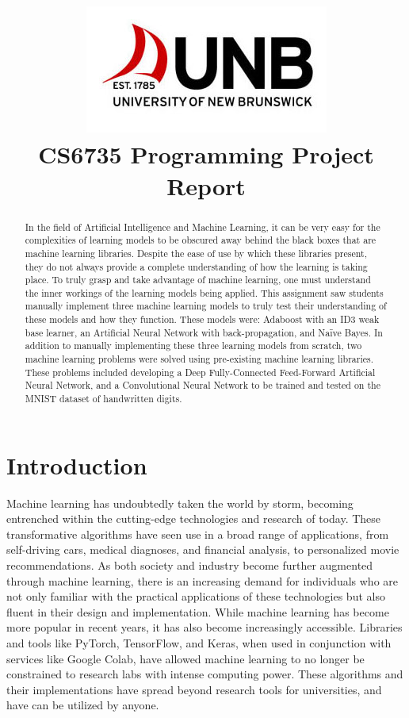 \documentclass[a4paper]{article}
\title{\includegraphics[scale=0.75]{images/unblogo.jpg}\\CS6735 Programming Project Report}
\begin{document}
\maketitle

\begin{abstract}
    In the field of Artificial Intelligence and Machine Learning, it can be very easy for the complexities of learning models to be obscured away behind the black boxes that are machine learning libraries. Despite the ease of use by which these libraries present, they do not always provide a complete understanding of how the learning is taking place. To truly grasp and take advantage of machine learning, one must understand the inner workings of the learning models being applied. This assignment saw students manually implement three machine learning models to truly test their understanding of these models and how they function. These models were: Adaboost with an ID3 weak base learner, an Artificial Neural Network with back-propagation, and Naïve Bayes. In addition to manually implementing these three learning models from scratch, two machine learning problems were solved using pre-existing machine learning libraries. These problems included developing a Deep Fully-Connected Feed-Forward Artificial Neural Network, and a Convolutional Neural Network to be trained and tested on the MNIST dataset of handwritten digits.
\end{abstract}

\newpage

\section{Introduction}

Machine learning has undoubtedly taken the world by storm, becoming entrenched within the cutting-edge technologies and research of today. These transformative algorithms have seen use in a broad range of applications, from self-driving cars, medical diagnoses, and financial analysis, to personalized movie recommendations. As both society and industry become further augmented through machine learning, there is an increasing demand for individuals who are not only familiar with the practical applications of these technologies but also fluent in their design and implementation. While machine learning has become more popular in recent years, it has also become increasingly accessible. Libraries and tools like PyTorch, TensorFlow, and Keras, when used in conjunction with services like Google Colab, have allowed machine learning to no longer be constrained to research labs with intense computing power. These algorithms and their implementations have spread beyond research tools for universities, and have can be utilized by anyone. 
\end{document}
